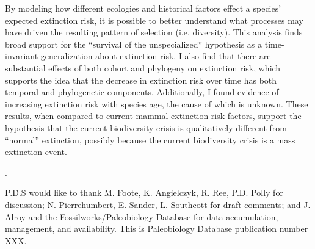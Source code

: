 \documentclass[12pt]{article}
\newcounter{lastnote}
\newenvironment{scilastnote}{%
\setcounter{lastnote}{\value{enumiv}}%
\addtocounter{lastnote}{+1}%
\begin{list}%
{\arabic{lastnote}.}
{\setlength{\leftmargin}{.22in}}
{\setlength{\labelsep}{.5em}}}
{\end{list}}
\begin{document}
By modeling how different ecologies and historical factors effect a species' expected extinction risk, it is possible to better understand what processes may have driven the resulting pattern of selection (i.e. diversity). This analysis finds broad support for the ``survival of the unspecialized'' hypothesis \cite{Simpson1944,Liow2004a} as a time-invariant generalization about extinction risk. I also find that there are substantial effects of both cohort and phylogeny on extinction risk, which supports the idea that the decrease in extinction risk \cite{Raup1982a} over time has both temporal and phylogenetic components. Additionally, I found evidence of increasing extinction risk with species age, the cause of which is unknown. These results, when compared to current mammal extinction risk factors, support the hypothesis that the current biodiversity crisis is qualitatively different from ``normal'' extinction, possibly because the current biodiversity crisis is a mass extinction event.





\begin{scilastnote}
\item P.D.S would like to thank M. Foote, K. Angielczyk, R. Ree, P.D. Polly for discussion; N. Pierrehumbert, E. Sander, L. Southcott for draft comments; and J. Alroy and the Fossilworks/Paleobiology Database for data accumulation, management, and availability. This is Paleobiology Database publication number XXX.
\end{scilastnote}


\end{document}
